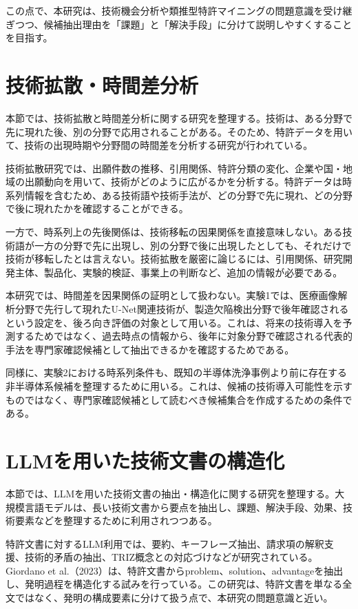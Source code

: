 この点で、本研究は、技術機会分析や類推型特許マイニングの問題意識を受け継ぎつつ、候補抽出理由を「課題」と「解決手段」に分けて説明しやすくすることを目指す。

\section{技術拡散・時間差分析}

本節では、技術拡散と時間差分析に関する研究を整理する。技術は、ある分野で先に現れた後、別の分野で応用されることがある。そのため、特許データを用いて、技術の出現時期や分野間の時間差を分析する研究が行われている。

技術拡散研究では、出願件数の推移、引用関係、特許分類の変化、企業や国・地域の出願動向を用いて、技術がどのように広がるかを分析する。特許データは時系列情報を含むため、ある技術語や技術手法が、どの分野で先に現れ、どの分野で後に現れたかを確認することができる。

一方で、時系列上の先後関係は、技術移転の因果関係を直接意味しない。ある技術語が一方の分野で先に出現し、別の分野で後に出現したとしても、それだけで技術が移転したとは言えない。技術拡散を厳密に論じるには、引用関係、研究開発主体、製品化、実験的検証、事業上の判断など、追加の情報が必要である。

本研究では、時間差を因果関係の証明として扱わない。実験1では、医療画像解析分野で先行して現れたU-Net関連技術が、製造欠陥検出分野で後年確認されるという設定を、後ろ向き評価の対象として用いる。これは、将来の技術導入を予測するためではなく、過去時点の情報から、後年に対象分野で確認される代表的手法を専門家確認候補として抽出できるかを確認するためである。

同様に、実験2における時系列条件も、既知の半導体洗浄事例より前に存在する非半導体系候補を整理するために用いる。これは、候補の技術導入可能性を示すものではなく、専門家確認候補として読むべき候補集合を作成するための条件である。

\section{LLMを用いた技術文書の構造化}

本節では、LLMを用いた技術文書の抽出・構造化に関する研究を整理する。大規模言語モデルは、長い技術文書から要点を抽出し、課題、解決手段、効果、技術要素などを整理するために利用されつつある。

特許文書に対するLLM利用では、要約、キーフレーズ抽出、請求項の解釈支援、技術的矛盾の抽出、TRIZ概念との対応づけなどが研究されている。Giordano et al.（2023）は、特許文書からproblem、solution、advantageを抽出し、発明過程を構造化する試みを行っている。この研究は、特許文書を単なる全文ではなく、発明の構成要素に分けて扱う点で、本研究の問題意識と近い。

